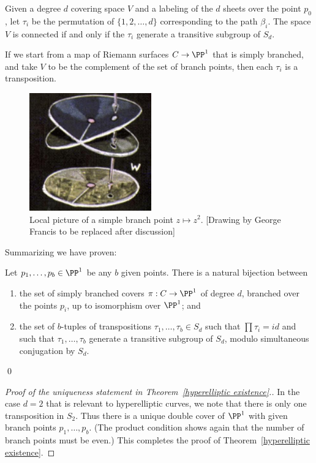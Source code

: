 Given a degree $d$ covering space $V$ and a labeling of the $d$ sheets over the point $p_0$, let $\tau_i$ be the permutation of $\{1,2,\dots,d\}$ corresponding to the path $\beta_i$. The space $V$ is connected if and only if the $\tau_{i}$ generate a transitive subgroup of $S_{d}$.
 
If we start from a map of Riemann surfaces $C\to \PP^{1}$ that is
 simply branched, and take $V$ to be the complement of the set of branch points, 
 then each $\tau_i$ is a transposition. 

\begin{figure}
\inprogress
\centerline {\includegraphics[height=2in]{"main/Fig05-2"}}
 \caption{Local picture of a simple branch point $z \mapsto z^2$.
   [Drawing by George Francis to be replaced after discussion]
}
\end{figure}

Summarizing we have proven:   
   \begin{lemma}\label{branched cover classification}
   Let $p_1,\dots, p_b \in \PP^1$ be any $b$ given points. There is a natural bijection between 
   \begin{enumerate}
   \item the set of  simply branched covers $\pi : C \to \PP^1$ of degree $d$, branched over the points $p_i$, up to isomorphism over $\PP^1$; and
   \item the set of $b$-tuples of transpositions $\tau_1, \dots, \tau_b \in S_d$ such that $\prod \tau_i = id$ and such that $\tau_1, \dots, \tau_b$ generate a transitive subgroup of $S_d$, modulo simultaneous conjugation by $S_d$.
   \end{enumerate}\qed
   \end{lemma}
   
\begin{proof}[Proof of the uniqueness statement  in Theorem~\ref{hyperelliptic existence}.]
In the case $d=2$ that is relevant to hyperelliptic curves, we note that there is only one transposition in $S_2$. Thus there is a unique double cover of $\PP^1$ with given branch points $p_1,\dots,p_b$. (The product
condition shows again that the number of branch points must be even.) This completes the proof of Theorem~\ref{hyperelliptic existence}.
\end{proof}

